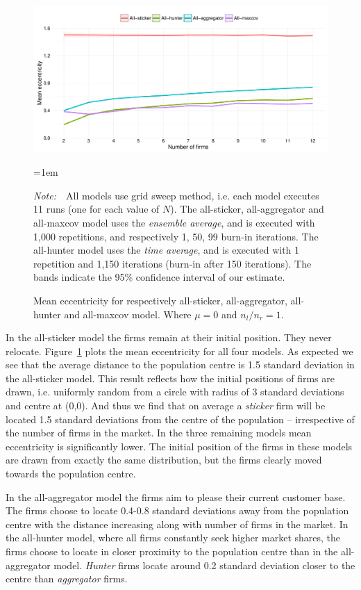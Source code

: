 \documentclass[preprint, 12pt]{elsarticle}
\newcommand{\Figtext}[1]{%
	\begin{tablenotes}[para,flushleft]
		\hangindent=1em
		\footnotesize
		\raggedright
		#1
	\end{tablenotes}
}
\newcommand{\Fignote}[1]{\Figtext{\emph{Note:~}~#1}}
\begin{document}
\begin{figure}[ht!]
	\centering
	\includegraphics[width=\textwidth]{Graphics/fig21a.pdf}
	\caption{Mean eccentricity for respectively all-sticker, all-aggregator, all-hunter and all-maxcov model. Where $\mu=0$ and $n_l/n_r=1$.}
	\label{fig:eccentricity}
	\Fignote{All models use grid sweep method, i.e. each model executes 11 runs (one for each value of $N$). The all-sticker, all-aggregator and all-maxcov model uses the \emph{ensemble average}, and is executed with 1,000 repetitions, and respectively 1, 50, 99 burn-in iterations. The all-hunter model uses the \emph{time average}, and is executed with 1 repetition and 1,150 iterations (burn-in after 150 iterations). The bands indicate the 95\% confidence interval of our estimate.}
\end{figure}

In the all-sticker model the firms remain at their initial position. They never relocate. Figure~\ref{fig:eccentricity} plots the mean eccentricity for all four models. As expected we see that the average distance to the population centre is 1.5 standard deviation in the all-sticker model. This result reflects how the initial positions of firms are drawn, i.e. uniformly random from a circle with radius of 3 standard deviations and centre at (0,0). And thus we find that on average a \emph{sticker} firm will be located 1.5 standard deviations from the centre of the population -- irrespective of the number of firms in the market. In the three remaining models mean eccentricity is significantly lower. The initial position of the firms in these models are drawn from exactly the same distribution, but the firms clearly moved towards the population centre. 

In the all-aggregator model the firms aim to please their current customer base. The firms choose to locate 0.4-0.8 standard deviations away from the population centre with the distance increasing along with number of firms in the market. In the all-hunter model, where all firms constantly seek higher market shares, the firms choose to locate in closer proximity to the population centre than in the all-aggregator model. \emph{Hunter} firms locate around 0.2 standard deviation closer to the centre than \emph{aggregator} firms.
\end{document}

